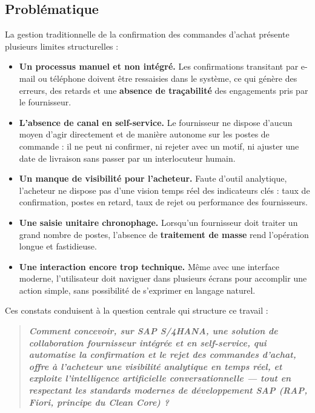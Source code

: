 \documentclass[12pt,a4paper,oneside]{report}
\begin{document}
\subsection{Problématique}\label{ch1:problematique-projet}

La gestion traditionnelle de la confirmation des commandes d'achat présente plusieurs
limites structurelles :

\begin{itemize}[label=---, itemsep=0.35em]
	\item \textbf{Un processus manuel et non intégré.} Les confirmations transitant
	      par e-mail ou téléphone doivent être ressaisies dans le système, ce qui
	      génère des erreurs, des retards et une \textbf{absence de traçabilité} des
	      engagements pris par le fournisseur.
	\item \textbf{L'absence de canal en self-service.} Le fournisseur ne dispose
	      d'aucun moyen d'agir directement et de manière autonome sur les postes de
	      commande : il ne peut ni confirmer, ni rejeter avec un motif, ni ajuster une
	      date de livraison sans passer par un interlocuteur humain.
	\item \textbf{Un manque de visibilité pour l'acheteur.} Faute d'outil analytique,
	      l'acheteur ne dispose pas d'une vision temps réel des indicateurs clés :
	      taux de confirmation, postes en retard, taux de rejet ou performance des
	      fournisseurs.
	\item \textbf{Une saisie unitaire chronophage.} Lorsqu'un fournisseur doit traiter
	      un grand nombre de postes, l'absence de \textbf{traitement de masse} rend
	      l'opération longue et fastidieuse.
	\item \textbf{Une interaction encore trop technique.} Même avec une interface
	      moderne, l'utilisateur doit naviguer dans plusieurs écrans pour accomplir
	      une action simple, sans possibilité de s'exprimer en langage naturel.
\end{itemize}

Ces constats conduisent à la question centrale qui structure ce travail :

\begin{quote}
\itshape\textbf{Comment concevoir, sur SAP S/4HANA, une solution de collaboration
fournisseur intégrée et en self-service, qui automatise la confirmation et le rejet
des commandes d'achat, offre à l'acheteur une visibilité analytique en temps réel,
et exploite l'intelligence artificielle conversationnelle --- tout en respectant les
standards modernes de développement SAP (RAP, Fiori, principe du Clean Core) ?}
\end{quote}
\end{document}
